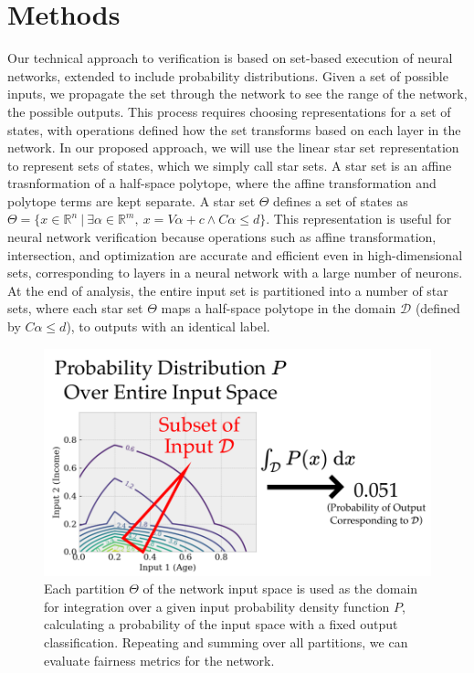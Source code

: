 \documentclass[11pt]{article}
\begin{document}
\section*{Methods}

Our technical approach to verification is based on set-based execution of neural networks, extended to include probability distributions.
%
Given a set of possible inputs, we propagate the set through the network to see the range of the network, the possible outputs.
%
This process requires choosing representations for a set of states, with operations defined how the set transforms based on each layer in the network.
%
In our proposed approach, we will use the linear star set representation~\cite{duggirala2016parsimonious,tran2020cav} to represent sets of states, which we simply call star sets.
%
A star set is an affine trasnformation of a half-space polytope, where the affine transformation and polytope terms are kept separate.
%
A star set $\Theta$ defines a set of states as $\Theta  = \{x \in \mathbb{R}^n ~ | ~ \exists {\alpha \in \mathbb{R}^m}, ~ x = V \alpha + c \wedge C\alpha \leq d\}$. 
%
This representation is useful for neural network verification because operations such as affine transformation, intersection, and optimization are accurate and efficient even in high-dimensional sets, corresponding to layers in a neural network with a large number of neurons.
%
At the end of analysis, the entire input set is partitioned into a number of star sets, where each star set $\Theta$ maps a half-space polytope in the domain $\mathcal{D}$ (defined by $C\alpha \leq d$), to outputs with an identical label.

\begin{figure}[t]
    \centering
    \includegraphics[width=0.6\columnwidth]{figs/fairness_image.pdf}
    \caption{Each partition $\Theta$ of the network input space is used as the domain for integration over a given input probability density function $P$, calculating a probability of the input space with a fixed output classification. 
    Repeating and summing over all partitions, we can evaluate fairness metrics for the network.}
    \label{fig:input_split}
\end{figure}
\end{document}
